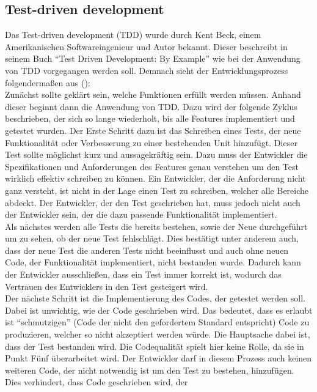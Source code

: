 \subsection{Test-driven development}\label{einleitung:tdd}
Das Test-driven development (TDD) wurde durch Kent Beck, einem Amerikanischen 
Softwareingenieur und Autor bekannt. Dieser beschreibt in seinem Buch "`Test 
Driven Development: By Example"' wie bei der Anwendung von TDD vorgegangen 
werden soll. Demnach sieht der Entwicklungsprozess folgendermaßen aus 
(\cite{beck:tdd}):
\newline
\\
Zunächst sollte geklärt sein, welche Funktionen erfüllt werden müssen. Anhand
dieser beginnt dann die Anwendung von TDD. Dazu wird der folgende Zyklus
beschrieben, der sich so lange wiederholt, bis alle Features implementiert
und getestet wurden. Der Erste Schritt dazu ist das Schreiben eines Tests, der 
neue Funktionalität oder Verbesserung zu einer bestehenden Unit hinzufügt. 
Dieser Test sollte möglichst kurz und aussagekräftig sein. Dazu muss der 
Entwickler die Spezifikationen und Anforderungen des Features genau verstehen 
um den Test wirklich effektiv schreiben zu können. Ein Entwickler, der die 
Anforderung nicht ganz versteht, ist nicht in der Lage einen Test zu 
schreiben, welcher alle Bereiche abdeckt. Der Entwickler, der den Test 
geschrieben hat, muss jedoch nicht auch der Entwickler sein, der die dazu 
passende Funktionalität implementiert.
\\
Als nächstes werden alle Tests die bereits bestehen, sowie der Neue
durchgeführt um zu sehen, ob der neue Test fehlschlägt. Dies bestätigt unter
anderem auch, dass der neue Test die anderen Tests nicht beeinflusst und auch
ohne neuen Code, der Funktionalität implementiert, nicht bestanden wurde. 
Dadurch kann der Entwickler ausschließen, dass ein Test immer korrekt ist, 
wodurch das Vertrauen des Entwicklers in den Test gesteigert wird.
\\
Der nächste Schritt ist die Implementierung des Codes, der getestet werden soll.
Dabei ist unwichtig, wie der Code geschrieben wird. Das bedeutet, dass es
erlaubt ist "`schmutzigen"' (Code der nicht den gefordertem Standard 
entspricht) Code zu produzieren, welcher so nicht akzeptiert werden würde. Die 
Hauptsache dabei ist, dass der Test bestanden wird. Die Codequalität spielt 
hier keine Rolle, da sie in Punkt Fünf überarbeitet wird. Der Entwickler darf 
in diesem Prozess auch keinen weiteren Code, der nicht notwendig ist um den 
Test zu bestehen, hinzufügen. Dies verhindert, dass Code geschrieben wird, der 
